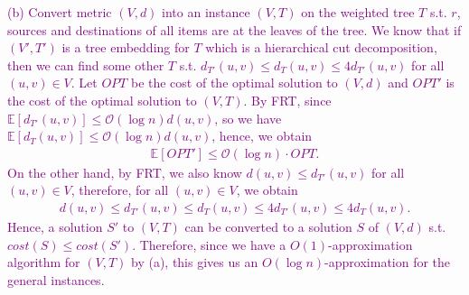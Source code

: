 \documentclass[11pt]{article}
\begin{document}
\textcolor{purple}{
    (b) Convert metric $(V,d)$ into an instance $(V,T)$ on the weighted tree $T$ s.t. $r$, sources and destinations of all items are at the leaves of the tree. We know that if $(V',T')$ is a tree embedding for $T$ which is a hierarchical cut decomposition, then we can find some other $T$ s.t. $d_{T'}(u,v)\leq d_T(u,v)\leq 4d_{T'}(u,v)$ for all $(u,v)\in V$. Let  $OPT$ be the cost of the optimal solution to $(V,d)$ and $OPT'$ is the cost of the optimal solution to $(V,T)$. By FRT, since $\mathbb{E}\left[d_{T'}(u,v)\right] \leq \mathcal{O}(\log n) d(u,v)$, so we have $\mathbb{E}\left[d_T(u,v)\right] \leq \mathcal{O}(\log n) d(u,v)$, hence, we obtain
    \begin{align}
        \mathbb{E}[OPT']\leq \mathcal{O}(\log n) \cdot OPT.
    \end{align}
    On the other hand, by FRT, we also know $d(u,v)\leq d_{T'}(u,v)$ for all $(u,v)\in V$, therefore, for all $(u,v)\in V$, we obtain
    \begin{align}
        d(u,v)\leq d_{T'}(u,v)\leq d_T(u,v)\leq 4d_{T'}(u,v) \leq 4d_{T}(u,v).
    \end{align}
    Hence, a solution $S'$ to $(V,T)$ can be converted to a solution $S$ of $(V,d)$ s.t. $cost(S)\leq cost(S')$. Therefore, since we have a $O(1)$-approximation algorithm for $(V,T)$ by (a), this gives us an $O(\log n)$-approximation for the general instances.
}
\end{document}
